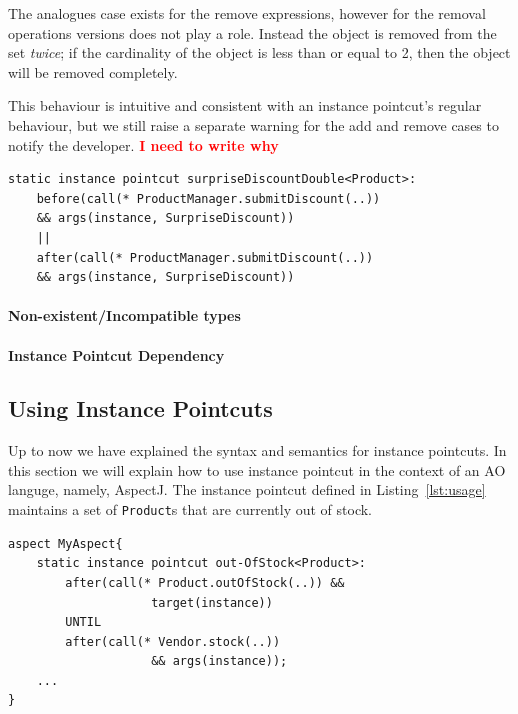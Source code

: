 \documentclass{acm_proc_article-sp}
\newcommand{\todok}[1]{\textcolor{red}{\textbf{#1}}}
\newcommand{\lstinln}[1]{\lstinline~#1~}
\begin{document}
The analogues case exists for the remove expressions, however for the removal operations versions does not play a role. Instead the object is removed from the set \emph{twice}; if the cardinality of the object is less than or equal to 2, then the object will be removed completely. 

This behaviour is intuitive and consistent with an instance pointcut's regular behaviour, but we still raise a separate warning for the add and remove cases to notify the developer. \todok{I need to write why}

\begin{lstlisting}[float=h!, caption={Adding the same object before and after the same join-point}, label={lst:objversion}]
static instance pointcut surpriseDiscountDouble<Product>: 
	before(call(* ProductManager.submitDiscount(..)) 
	&& args(instance, SurpriseDiscount)) 
	||
	after(call(* ProductManager.submitDiscount(..)) 
	&& args(instance, SurpriseDiscount)) 
\end{lstlisting}

\paragraph*{Non-existent/Incompatible types}



\paragraph*{Instance Pointcut Dependency}



\subsection{Using Instance Pointcuts}
Up to now we have explained the syntax and semantics for instance pointcuts. In this section we will explain how to use instance pointcut in the context of an AO languge, namely, AspectJ. The instance pointcut defined in Listing~\ref{lst:usage} maintains a set of \lstinln{Product}s that are currently out of stock.

\begin{lstlisting}[float=h!, caption={An instance pointcut for out of stock products}, label={lst:usage}]
aspect MyAspect{
	static instance pointcut out-OfStock<Product>: 
		after(call(* Product.outOfStock(..)) && 
					target(instance)) 
		UNTIL 
		after(call(* Vendor.stock(..)) 
					&& args(instance));
	...
}
\end{lstlisting}
\end{document}
